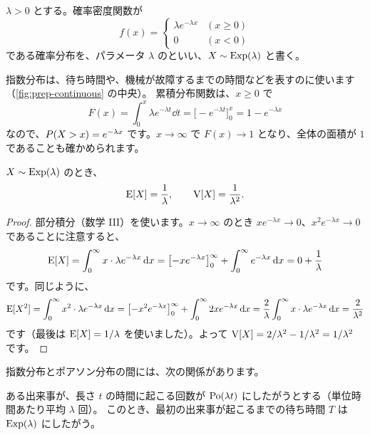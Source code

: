 \begin{definition}
  $\lambda > 0$ とする。確率密度関数が
  \[
    f(x) = \begin{cases} \lambda e^{-\lambda x} & (x \ge 0) \\ 0 & (x < 0) \end{cases}
  \]
  である確率分布を、パラメータ $\lambda$ のといい、$X \sim \mathrm{Exp}(\lambda)$ と書く。
\end{definition}

指数分布は、待ち時間や、機械が故障するまでの時間などを表すのに使います（\cref{fig:prep-continuous} の中央）。
累積分布関数は、$x \ge 0$ で
\[
  F(x) = \int_0^x \lambda e^{-\lambda t} \dd t = \bigl[-e^{-\lambda t}\bigr]_0^x = 1 - e^{-\lambda x}
\]
なので、$P(X > x) = e^{-\lambda x}$ です。$x \to \infty$ で $F(x) \to 1$ となり、全体の面積が $1$ であることも確かめられます。

\begin{theorem}
  $X \sim \mathrm{Exp}(\lambda)$ のとき、
  \[
    \mathrm{E}[X] = \frac{1}{\lambda}, \qquad \mathrm{V}[X] = \frac{1}{\lambda^2}.
  \]
\end{theorem}

\begin{proof}
  部分積分（数学 III）を使います。$x \to \infty$ のとき $x e^{-\lambda x} \to 0$、$x^2 e^{-\lambda x} \to 0$ であることに注意すると、
  \[
    \mathrm{E}[X] = \int_0^\infty x \cdot \lambda e^{-\lambda x} \mathop{}\!\mathrm{d} x
    = \bigl[-x e^{-\lambda x}\bigr]_0^\infty + \int_0^\infty e^{-\lambda x} \mathop{}\!\mathrm{d} x
    = 0 + \frac{1}{\lambda}
  \]
  です。同じように、
  \[
    \mathrm{E}[X^2] = \int_0^\infty x^2 \cdot \lambda e^{-\lambda x} \mathop{}\!\mathrm{d} x
    = \bigl[-x^2 e^{-\lambda x}\bigr]_0^\infty + \int_0^\infty 2x e^{-\lambda x} \mathop{}\!\mathrm{d} x
    = \frac{2}{\lambda} \int_0^\infty x \cdot \lambda e^{-\lambda x} \mathop{}\!\mathrm{d} x = \frac{2}{\lambda^2}
  \]
  です（最後は $\mathrm{E}[X] = 1/\lambda$ を使いました）。よって $\mathrm{V}[X] = 2/\lambda^2 - 1/\lambda^2 = 1/\lambda^2$ です。
\end{proof}

指数分布とポアソン分布の間には、次の関係があります。

\begin{proposition}
  ある出来事が、長さ $t$ の時間に起こる回数が $\mathrm{Po}(\lambda t)$ にしたがうとする（単位時間あたり平均 $\lambda$ 回）。
  このとき、最初の出来事が起こるまでの待ち時間 $T$ は $\mathrm{Exp}(\lambda)$ にしたがう。
\end{proposition}

